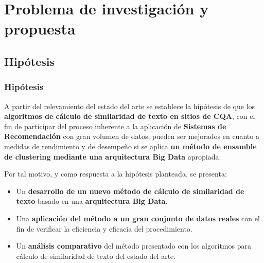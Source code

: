 \section{Problema de investigación y propuesta}

\subsection{Hipótesis}
\begin{frame}[allowframebreaks]
	\frametitle{Hipótesis}
	\begin{tcolorbox}[colback=blue!5,colframe=blue!40!black,title=Hipótesis del trabajo de tesis]
		A partir del relevamiento del estado del arte se establece la hipótesis de que los \textbf{algoritmos de cálculo de similaridad de texto en sitios de CQA}, con el fin de participar del proceso inherente a la aplicación de \textbf{Sistemas de Recomendación} con gran volumen de datos, pueden ser mejorados en cuanto a medidas de rendimiento y de desempeño si se aplica \textbf{un método de ensamble de clustering mediante una arquitectura Big Data} apropiada.
	\end{tcolorbox}

	\framebreak

	\begin{tcolorbox}[colback=blue!5,colframe=blue!40!black,title=Hipótesis del trabajo de tesis (cont.)]
		\bigskip Por tal motivo, y como respuesta a la hipótesis planteada, se presenta:
		\begin{itemize}[<*>]
			\item Un \textbf{desarrollo de un nuevo método de cálculo de similaridad de texto} basado en una \textbf{arquitectura Big Data}.
			\item Una \textbf{aplicación del método a un gran conjunto de datos reales} con el fin de verificar la eficiencia y eficacia del procedimiento.
			\item Un \textbf{análisis comparativo} del método presentado con los algoritmos para cálculo de similaridad de texto del estado del arte.
		\end{itemize}
	\end{tcolorbox}
\end{frame}

